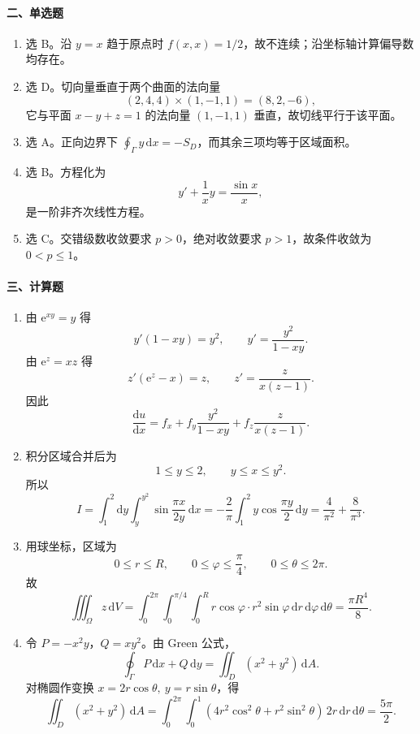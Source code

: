 \paragraph*{二、单选题}
\begin{enumerate}
  \item 选 B。沿 \(y=x\) 趋于原点时 \(f(x,x)=1/2\)，故不连续；沿坐标轴计算偏导数均存在。
  \item 选 D。切向量垂直于两个曲面的法向量
  \[
    (2,4,4)\times(1,-1,1)=(8,2,-6),
  \]
  它与平面 \(x-y+z=1\) 的法向量 \((1,-1,1)\) 垂直，故切线平行于该平面。
  \item 选 A。正向边界下 \(\oint_\Gamma y\,\mathrm{d}x=-S_D\)，而其余三项均等于区域面积。
  \item 选 B。方程化为
  \[
    y'+\frac1x y=\frac{\sin x}{x},
  \]
  是一阶非齐次线性方程。
  \item 选 C。交错级数收敛要求 \(p>0\)，绝对收敛要求 \(p>1\)，故条件收敛为 \(0<p\le 1\)。
\end{enumerate}

\paragraph*{三、计算题}
\begin{enumerate}
  \item 由 \(\mathrm{e}^{xy}=y\) 得
  \[
    y'(1-xy)=y^2,\qquad y'=\frac{y^2}{1-xy}.
  \]
  由 \(\mathrm{e}^z=xz\) 得
  \[
    z'(\mathrm{e}^z-x)=z,\qquad z'=\frac{z}{x(z-1)}.
  \]
  因此
  \[
    \frac{\mathrm{d}u}{\mathrm{d}x}
    =f_x+f_y\frac{y^2}{1-xy}+f_z\frac{z}{x(z-1)}.
  \]

  \item 积分区域合并后为
  \[
    1\le y\le 2,\qquad y\le x\le y^2.
  \]
  所以
  \[
    I=\int_1^2\mathrm{d}y\int_y^{y^2}\sin\frac{\pi x}{2y}\,\mathrm{d}x
    =-\frac2\pi\int_1^2 y\cos\frac{\pi y}{2}\,\mathrm{d}y
    =\frac4{\pi^2}+\frac8{\pi^3}.
  \]

  \item 用球坐标，区域为
  \[
    0\le r\le R,\qquad 0\le\varphi\le\frac{\pi}{4},\qquad 0\le\theta\le2\pi.
  \]
  故
  \[
    \iiint_\Omega z\,\mathrm{d}V
    =\int_0^{2\pi}\!\!\int_0^{\pi/4}\!\!\int_0^R r\cos\varphi\cdot r^2\sin\varphi\,\mathrm{d}r\,\mathrm{d}\varphi\,\mathrm{d}\theta
    =\frac{\pi R^4}{8}.
  \]

  \item 令 \(P=-x^2y\)，\(Q=xy^2\)。由 Green 公式，
  \[
    \oint_\Gamma P\,\mathrm{d}x+Q\,\mathrm{d}y
    =\iint_D(x^2+y^2)\,\mathrm{d}A.
  \]
  对椭圆作变换 \(x=2r\cos\theta,\ y=r\sin\theta\)，得
  \[
    \iint_D(x^2+y^2)\,\mathrm{d}A
    =\int_0^{2\pi}\!\!\int_0^1(4r^2\cos^2\theta+r^2\sin^2\theta)\,2r\,\mathrm{d}r\,\mathrm{d}\theta
    =\frac{5\pi}{2}.
  \]
\end{enumerate}

